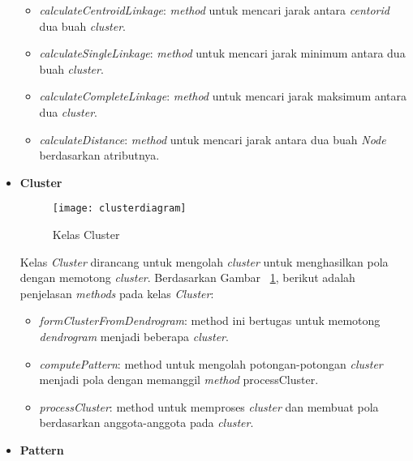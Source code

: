 \begin{itemize}
\begin{itemize}
\item \textit{calculateCentroidLinkage}: \textit{method} untuk mencari jarak antara \textit{centorid} dua buah \textit{cluster}.

\item \textit{calculateSingleLinkage}: \textit{method} untuk mencari jarak minimum antara dua buah \textit{cluster}.

\item \textit{calculateCompleteLinkage}: \textit{method} untuk mencari jarak maksimum antara dua \textit{cluster}.

\item \textit{calculateDistance}: \textit{method} untuk mencari jarak antara dua buah \textit{Node} berdasarkan atributnya.\\
 
\end{itemize}


\item \textbf{Cluster}\\

\begin{figure}[H]
    \centering  
    \texttt{[image: clusterdiagram]}  
    \caption[Kelas Cluster]{Kelas Cluster} 
    \label{fig:clusterdiagram} 
\end{figure}

Kelas \textit{Cluster} dirancang untuk mengolah \textit{cluster} untuk menghasilkan pola dengan memotong \textit{cluster}. Berdasarkan Gambar ~\ref{fig:clusterdiagram}, berikut adalah penjelasan \textit{methods} pada kelas \textit{Cluster}:

\begin{itemize}

\item \textit{formClusterFromDendrogram}: method ini bertugas untuk memotong \textit{dendrogram} menjadi beberapa \textit{cluster}.

\item \textit{computePattern}: method untuk mengolah potongan-potongan \textit{cluster} menjadi pola dengan memanggil \textit{method} processCluster.

\item \textit{processCluster}: method untuk memproses \textit{cluster} dan membuat pola berdasarkan anggota-anggota pada \textit{cluster}.\\
 
\end{itemize}


\item \textbf{Pattern}\\


\end{itemize}
